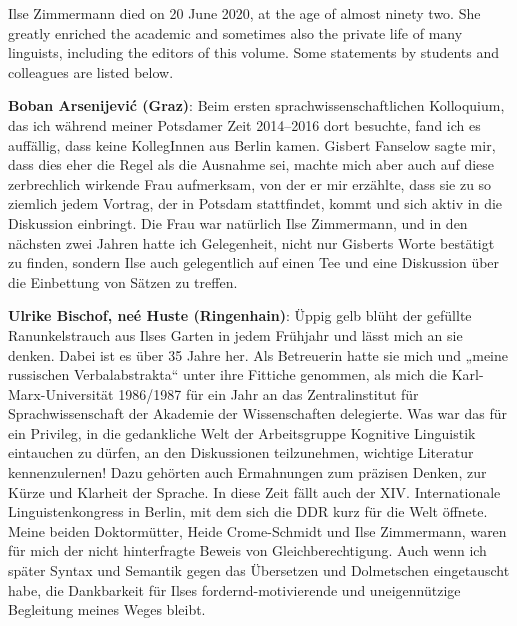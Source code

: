 \documentclass[output=paper,colorlinks,citecolor=brown]{langscibook}
\begin{document}
Ilse Zimmermann died on 20 June 2020, at the age of almost ninety two. She greatly enriched the academic and sometimes also the private life of many linguists, including the editors of this volume. Some statements by students and colleagues are listed below.\medskip


\noindent \textbf{Boban Arsenijević (Graz)}: Beim ersten sprachwissenschaftlichen Kolloquium, das ich während meiner Potsdamer Zeit 2014--2016 dort besuchte, fand ich es auffällig, dass keine KollegInnen aus Berlin kamen. Gisbert Fanselow sagte mir, dass dies eher die Regel als die Ausnahme sei, machte mich aber auch auf diese zerbrechlich wirkende Frau aufmerksam, von der er mir erzählte, dass sie zu so ziemlich jedem Vortrag, der in Potsdam stattfindet, kommt und sich aktiv in die Diskussion einbringt. Die Frau war natürlich Ilse Zimmermann, und in den nächsten zwei Jahren hatte ich Gelegenheit, nicht nur Gisberts Worte bestätigt zu finden, sondern Ilse auch gelegentlich auf einen Tee und eine Diskussion über die Einbettung von Sätzen zu treffen. \medskip

\noindent \textbf{Ulrike Bischof, neé Huste (Ringenhain)}: Üppig gelb blüht der gefüllte Ranunkelstrauch aus Ilses Garten in jedem Frühjahr und lässt mich an sie denken. Dabei ist es über 35 Jahre her. Als Betreuerin hatte sie mich und „meine russischen Verbalabstrakta“ unter ihre Fittiche genommen, als mich die Karl-Marx-Universität 1986/1987 für ein Jahr an das Zentralinstitut für Sprachwissenschaft der Aka\-de\-mie der Wissenschaften delegierte. Was war das für ein Privileg, in die ge\-dank\-li\-che Welt der Arbeitsgruppe Kognitive Linguistik eintauchen zu dürfen, an den Diskussionen teilzunehmen, wichtige Literatur kennenzulernen! Dazu gehörten auch Ermahnungen zum präzisen Denken, zur Kürze und Klarheit der Sprache. In diese Zeit fällt auch der XIV. Internationale Linguistenkongress in Berlin, mit dem sich die DDR kurz für die Welt öffnete. Meine beiden Doktormütter, Heide Crome-Schmidt und Ilse Zimmermann, waren für mich der nicht hinterfragte Beweis von Gleichberechtigung. Auch wenn ich später Syntax und Semantik gegen das Übersetzen und Dolmetschen eingetauscht habe, die Dankbarkeit für Ilses fordernd-motivierende und uneigennützige Begleitung meines Weges bleibt. \medskip
\end{document}
